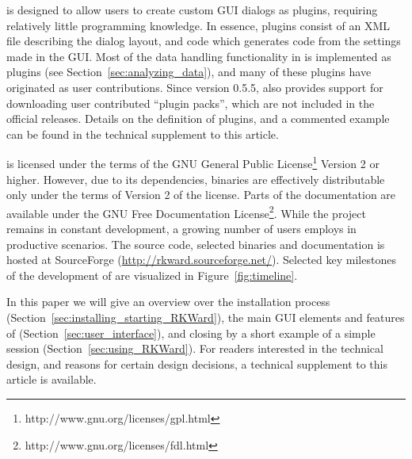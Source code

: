  is designed to allow users to create custom GUI dialogs as plugins, requiring relatively
little programming knowledge. In essence,  plugins consist of an XML file describing
the dialog layout, and  code which generates  code from the settings
made in the GUI. Most of the data handling functionality in  is implemented as plugins
(see Section~\ref{sec:analyzing_data}), and many of these plugins have originated as user contributions.
Since version 0.5.5,  also provides support for downloading user contributed ``plugin packs'',
which are not included in the official  releases. Details on the definition of plugins,
and a commented example can be found in the technical supplement to this article.

 is licensed under the terms of the GNU General Public License\footnote{http://www.gnu.org/licenses/gpl.html} Version 2
or higher. However, due to its dependencies,  binaries are effectively
distributable only under the terms of Version 2 of the license. Parts of the documentation are available under the
GNU Free Documentation License\footnote{http://www.gnu.org/licenses/fdl.html}. While the project remains in constant development, a growing
number of users employs  in productive scenarios. The source code,
selected binaries and documentation is hosted at SourceForge
(\url{http://rkward.sourceforge.net/}). Selected key milestones of the development of  are
visualized in Figure~\ref{fig:timeline}.

In this paper we will give an overview over the installation process (Section~\ref{sec:installing_starting_RKWard}), the main GUI elements and
features of  (Section~\ref{sec:user_interface}), and closing by a short example 
of a simple  session (Section~\ref{sec:using_RKWard}). For readers interested in the technical
design, and reasons for certain design decisions, a technical supplement to this article
is available.

